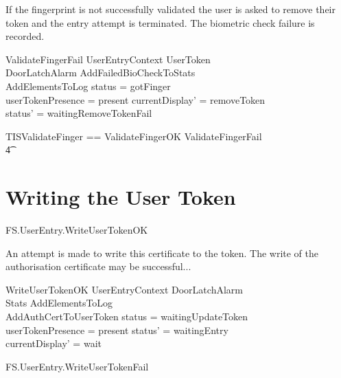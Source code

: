If the fingerprint is not successfully validated the user is asked to
remove their token and the entry attempt is terminated. 
The biometric check failure is recorded.

\begin{schema}{ValidateFingerFail}
        UserEntryContext
\also
	\Xi UserToken
\\      \Xi DoorLatchAlarm
\also      
        AddFailedBioCheckToStats
\\      AddElementsToLog
\where
        status = gotFinger
\\      userTokenPresence = present
\also
        currentDisplay' = removeToken
\\      status' = waitingRemoveTokenFail
\end{schema}

\begin{zed}
        TISValidateFinger == ValidateFingerOK \lor ValidateFingerFail
\\ \t4  \lor [~ UserTokenTorn | status = gotFinger ~]
\end{zed}

\section{Writing the User Token}


\begin{traceunit}{FS.UserEntry.WriteUserTokenOK}
\end{traceunit}

An attempt is made to write this certificate to the token. The write of
the authorisation certificate may be successful...

\begin{schema}{WriteUserTokenOK}
	UserEntryContext
\also
	\Xi DoorLatchAlarm
\\      \Xi Stats
\also
        AddElementsToLog
\\      AddAuthCertToUserToken
\where
	status = waitingUpdateToken
\\      userTokenPresence = present
\also
        status' = waitingEntry
\\      currentDisplay' = wait
\end{schema}


\begin{traceunit}{FS.UserEntry.WriteUserTokenFail}
\end{traceunit}

